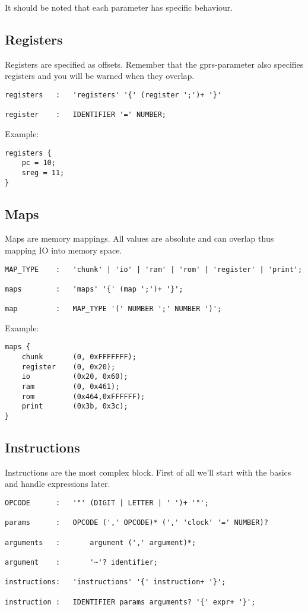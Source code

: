 It should be noted that each parameter has specific behaviour.

\subsection{Registers}
Registers are specified as offsets. Remember that the gprs-parameter also
specifies registers and you will be warned when they overlap.
\begin{lstlisting}
registers	:	'registers' '{' (register ';')+ '}'

register	:	IDENTIFIER '=' NUMBER;
\end{lstlisting}

Example:
\begin{lstlisting}
registers {
	pc = 10;
	sreg = 11;
}
\end{lstlisting}

\subsection{Maps}
Maps are memory mappings. All values are absolute and can overlap thus mapping
IO into memory space.
\begin{lstlisting}
MAP_TYPE	:	'chunk' | 'io' | 'ram' | 'rom' | 'register' | 'print';

maps		:	'maps' '{' (map ';')+ '}';

map			:	MAP_TYPE '(' NUMBER ';' NUMBER ')';
\end{lstlisting}

Example:
\begin{lstlisting}
maps {
	chunk		(0, 0xFFFFFFF);
	register	(0, 0x20);
	io			(0x20, 0x60);
	ram			(0, 0x461);
	rom			(0x464,0xFFFFFF);
	print		(0x3b, 0x3c);
}
\end{lstlisting}

\subsection{Instructions}
Instructions are the most complex block. First of all we'll start with the
basics and handle expressions later.

\begin{lstlisting}
OPCODE		:	'"' (DIGIT | LETTER | ' ')+ '"';

params		:	OPCODE (',' OPCODE)* (',' 'clock' '=' NUMBER)?

arguments	:		argument (',' argument)*;

argument	:		'~'? identifier;

instructions:	'instructions' '{' instruction+ '}';

instruction	:	IDENTIFIER params arguments? '{' expr+ '}';
\end{lstlisting}

